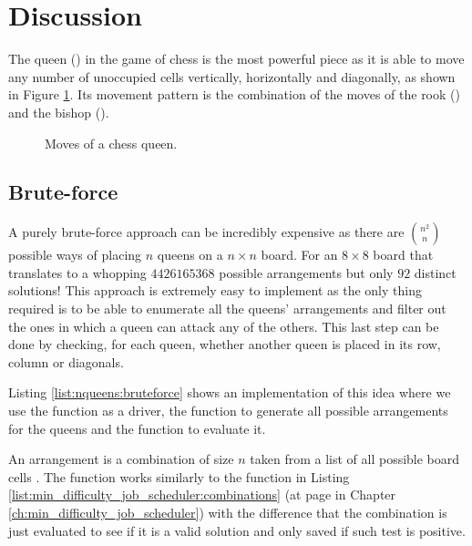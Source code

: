 \section{Discussion}
\label{nqueens:sec:discussion}
The queen (\symqueen) in the game of chess is the most powerful piece as it is able to move any
number of unoccupied cells vertically, horizontally and diagonally, as shown in Figure
\ref{fig:nqueens:queen_movements}. Its movement pattern is the combination of the moves of the rook
(\symrook) and the bishop (\symbishop).

\begin{figure}
	\centering 
	\def\myfen{8/8/8/8/8/3q3/8/8 w - - 0 1} \chessboard[setfen=\myfen, pgfstyle=straightmove,
	arrow=stealth, linewidth=.3ex, padding=2ex, color=black!75!white, shortenstart=1.15ex,
	showmover=false, markmoves={d3-h7,d3-a6,d3-b1,d3-f1,d3-d8,d3-d1,d3-a3,d3-h3}] 
	\caption{Moves of a chess queen.}
	 \label{fig:nqueens:queen_movements}
\end{figure}



\subsection{Brute-force}
\label{nqueens:sec:bruteforce}

A purely brute-force approach can be incredibly expensive as there are ${n^2 \choose n}$ possible
ways of placing $n$ queens on a $n \times n$ board. For an $8 \times 8$ board that translates to a
whopping $4426165368$ possible arrangements but only $92$ distinct solutions! This approach is
extremely easy to implement as the only thing required is to be able to enumerate all the
queens' arrangements and filter out the ones in which a queen can attack any of the others. This
last step can be done by checking, for each queen, whether another queen is placed in its row,
column or diagonals. 

Listing \ref{list:nqueens:bruteforce} shows an implementation of this idea where we
use the function  as a driver, the function
 to generate all possible arrangements for the queens and the
function  to evaluate it.

An arrangement is a combination of size $n$ taken
from a list of all possible board cells . The function
 works similarly to the function  in
Listing \ref{list:min_difficulty_job_scheduler:combinations} (at page
\pageref{list:min_difficulty_job_scheduler:combinations} in Chapter
\ref{ch:min_difficulty_job_scheduler}) with the difference that the combination is just evaluated to
see if it is a valid solution and only saved if such test is positive.

